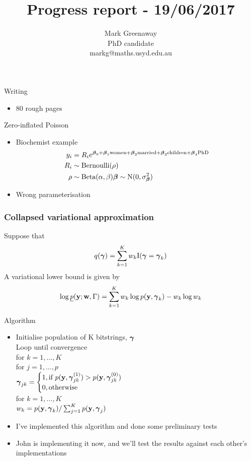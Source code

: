 \documentclass{beamer}
\title{Progress report - 19/06/2017}
\author{Mark Greenaway\\PhD candidate\\markg@maths.usyd.edu.au}
\begin{document}
\begin{frame}
\maketitle
\end{frame}

\begin{frame}{Writing}
\begin{itemize}
\item 80 rough pages
\end{itemize}
\end{frame}

\begin{frame}{Zero-inflated Poisson}
\begin{itemize}
\item{Biochemist example}
\begin{align*}
y_i &= R_i e^{{\boldsymbol \beta}_0 + {\boldsymbol \beta}_1 \text{women} + {\boldsymbol \beta}_2 \text{married} + {\boldsymbol \beta}_3 \text{children} + {\boldsymbol \beta}_4 \text{PhD}} \\
R_i &\sim \text{Bernoulli} (\rho) \\
\rho &\sim \text{Beta}(\alpha, \beta)
{\boldsymbol \beta} \sim \text{N}(0, \sigma_{\boldsymbol \beta}^2)
\end{align*}
\item Wrong parameterisation
\end{itemize}
\end{frame}

\begin{frame}
\frametitle{Collapsed variational approximation}
Suppose that
\[
	q({\boldsymbol \gamma}) = \sum_{k=1}^K w_k \text{I}({\boldsymbol \gamma} = {\boldsymbol \gamma}_k)
\]
A variational lower bound is given by
\[
\log \underline{p}({\bf y}; {\bf w}, \Gamma) = \sum_{k=1}^K w_k \log p({\bf y}, {\boldsymbol \gamma}_k) - w_k \log w_k
\]
\end{frame}

\begin{frame}{Algorithm}
\begin{itemize}
\item Initialise population of K bitstrings, ${\boldsymbol \gamma}$ \\
Loop until convergence\\
\quad for $k = 1,  \ldots, K$\\
\quad \quad for $j = 1, \ldots, p$\\
\quad \quad \quad ${\boldsymbol \gamma}_{jk} = \begin{cases}
1, \text{if } p({\bf y}, {\boldsymbol \gamma}_{jk}^{(1)}) > p({\bf y}, {\boldsymbol \gamma}_{jk}^{(0)}) \\
0, \text{otherwise}
\end{cases}$\\
\quad for $k = 1, \ldots, K$\\
\quad \quad $w_k = p({\bf y}, {\boldsymbol \gamma}_k) / \sum_{j=1}^K p({\bf y}, {\boldsymbol \gamma}_j)$
\item I've implemented this algorithm and done some preliminary tests
\item John is implementing it now, and we'll test the results against each other's implementations
\end{itemize}
\end{frame}
\end{document}
